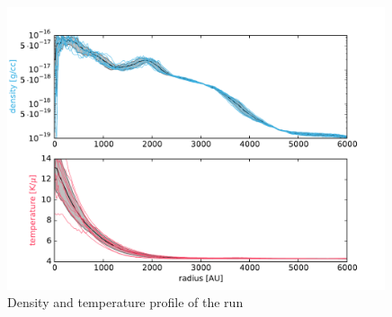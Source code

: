 \begin{figure}[!htb]
 \centering
 \includegraphics[width=0.99\textwidth]{Figures/var_rt_profiles/timeave_n10c10_6000AU}
 \captionsetup{justification=justified,singlelinecheck=false,width=\linewidth}
 \decoRule
 \caption[ profiles]{Density and temperature profile of the  run}
\label{fig:n10c10.0_profile}
\end{figure}
\FloatBarrier

